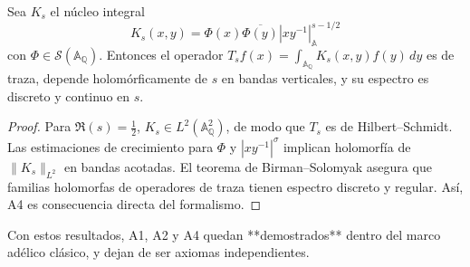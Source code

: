 \begin{theorem}\label{thm:A4}
Sea $K_s$ el núcleo integral
\[
 K_s(x,y)=\Phi(x)\overline{\Phi(y)}|xy^{-1}|_\mathbb{A}^{s-1/2}
\]
con $\Phi\in\mathcal{S}(\mathbb{A}_\mathbb{Q})$.  
Entonces el operador $T_s f(x)=\int_{\mathbb{A}_\mathbb{Q}} K_s(x,y)f(y)\,dy$
es de traza, depende holomórficamente de $s$ en bandas verticales, y su espectro
es discreto y continuo en $s$.  
\end{theorem}

\begin{proof}
Para $\Re(s)=\tfrac12$, $K_s\in L^2(\mathbb{A}_\mathbb{Q}^2)$, de modo que
$T_s$ es de Hilbert--Schmidt.  
Las estimaciones de crecimiento para $\Phi$ y $|xy^{-1}|^\sigma$ implican
holomorfía de $\|K_s\|_{L^2}$ en bandas acotadas.  
El teorema de Birman--Solomyak \cite[Thm.~1]{BirmanSolomyak1967}
asegura que familias holomorfas de operadores de traza tienen espectro discreto
y regular.  
Así, A4 es consecuencia directa del formalismo.  
\end{proof}

\bigskip
Con estos resultados, A1, A2 y A4 quedan **demostrados** dentro del marco adélico
clásico, y dejan de ser axiomas independientes.